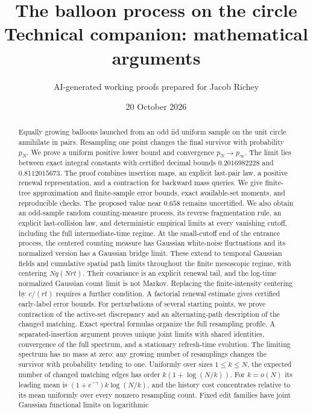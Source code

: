 \documentclass[11pt,letterpaper]{article}
\title{The balloon process on the circle\\\large Technical companion: mathematical arguments}
\author{AI-generated working proofs prepared for Jacob Richey}
\date{20 October 2026}
\begin{document}
\maketitle
\vspace{-1.3em}
\begin{abstract}
Equally growing balloons launched from an odd iid uniform sample on the
unit circle annihilate in pairs. Resampling one point changes the final
survivor with probability $p_N$. We prove a uniform positive lower bound
and convergence $p_N\to p_\infty$. The limit lies between exact integral
constants with certified decimal bounds $0.2016982228$ and
$0.8112015673$. The proof combines
insertion maps, an explicit last-pair law, a positive renewal
representation, and a contraction for backward mass queries. We give
finite-tree approximation and finite-sample error bounds, exact
available-set moments, and reproducible checks. The proposed value near
$0.658$ remains uncertified. We also obtain an odd-sample random
counting-measure process, its reverse fragmentation rule, an explicit
last-collision law, and deterministic empirical limits at every vanishing
cutoff, including the full intermediate-time regime. At the small-cutoff
end of the entrance process, the centered counting measure has Gaussian
white-noise fluctuations and its normalized version has a Gaussian bridge
limit. These extend to temporal Gaussian fields and cumulative spatial
path limits throughout the finite mesoscopic regime, with centering
$Nq(Nrt)$. Their covariance is an explicit renewal tail, and the
log-time normalized Gaussian count limit is not Markov.
Replacing the finite-intensity centering by $c/(rt)$ requires a further condition.
A factorial renewal estimate gives certified early-label error bounds.
For perturbations of several starting points, we prove contraction of
the active-set discrepancy and an alternating-path description of the
changed matching. Exact spectral formulas organize the full resampling
profile. A separated-insertion argument proves unique joint limits with
shared identities, convergence of the full spectrum, and a stationary
refresh-time evolution. The limiting spectrum has no mass at zero:
any growing number of resamplings changes the survivor with probability
tending to one. Uniformly over sizes $1\le k\le N$, the expected
number of changed matching edges has order $k(1+\log(N/k))$.
For $k=o(N)$ its leading mean is
$(1+e^{-\gamma})k\log(N/k)$, and the history cost concentrates
relative to its mean uniformly over every nonzero resampling count.
Fixed edit families have joint Gaussian functional limits on logarithmic

\end{abstract}
\end{document}

